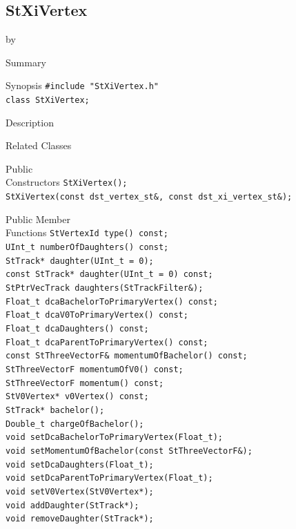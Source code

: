 \documentclass[twoside]{article}
\newcommand{\entrylabel}[1]{\mbox{\textbf{{#1}}}\hfil}%
\newenvironment{entry}
{\begin{list}{}%
    {\renewcommand{\makelabel}{\entrylabel}%
     \setlength{\labelwidth}{90pt}%
     \setlength{\leftmargin}{\labelwidth}
     \advance\leftmargin by \labelsep%
      }%
    }%
  {\end{list}}
\newcommand{\Entrylabel}[1]%
{\raisebox{0pt}[1ex][0pt]{\makebox[\labelwidth][l]%
    {\parbox[t]{\labelwidth}{\hspace{0pt}\textbf{{#1}}}}}}
\newenvironment{Entry}%
{\renewcommand{\entrylabel}{\Entrylabel}\begin{entry}}%
  {\end{entry}}
\begin{document}
\subsection{StXiVertex}
\label{sec:StXiVertex}
\begin{Entry}
\item[Summary]
\item[Synopsis]
    \verb+#include "StXiVertex.h"+\\
    \verb+class StXiVertex;+\\
\item[Description]
\item[Related Classes]
\item[Public\\ Constructors]
    \verb+StXiVertex();+\\
    \verb+StXiVertex(const dst_vertex_st&, const dst_xi_vertex_st&);+\\
\item[Public Member\\ Functions]
    \verb+StVertexId type() const;+\\
    \verb+UInt_t numberOfDaughters() const;+\\
    \verb+StTrack* daughter(UInt_t = 0);+\\
    \verb+const StTrack* daughter(UInt_t = 0) const;+\\
    \verb+StPtrVecTrack daughters(StTrackFilter&);+\\
    \verb+Float_t dcaBachelorToPrimaryVertex() const;+\\
    \verb+Float_t dcaV0ToPrimaryVertex() const;+\\
    \verb+Float_t dcaDaughters() const;+\\
    \verb+Float_t dcaParentToPrimaryVertex() const;+\\
    \verb+const StThreeVectorF& momentumOfBachelor() const;+\\
    \verb+StThreeVectorF momentumOfV0() const;+\\
    \verb+StThreeVectorF momentum() const;+\\
    \verb+StV0Vertex* v0Vertex() const;+\\
    \verb+StTrack* bachelor();+\\
    \verb+Double_t chargeOfBachelor();+\\
    \verb+void setDcaBachelorToPrimaryVertex(Float_t);+\\
    \verb+void setMomentumOfBachelor(const StThreeVectorF&);+\\
    \verb+void setDcaDaughters(Float_t);+\\
    \verb+void setDcaParentToPrimaryVertex(Float_t);+\\
    \verb+void setV0Vertex(StV0Vertex*);+\\
    \verb+void addDaughter(StTrack*);+\\
    \verb+void removeDaughter(StTrack*);+\\
\end{Entry}
\clearpage
\end{document}
